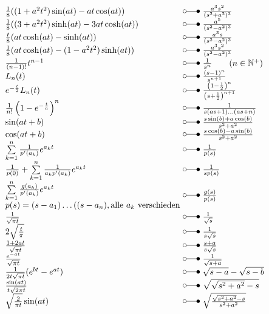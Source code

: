\[ \begin{array}{@{}l@{ ~ \laplace ~ }l@{}}
\frac{1}{8} ((1 + a^2 t^2) \sin(at) - at \cos(at)) &
    \frac{a^3 s^2}{(s^2 + a^2)^3} \\
\frac{1}{8} ((3 + a^2 t^2) \sinh(at) - 3 at \cosh(at)) &
    \frac{a^5}{(s^2 - a^2)^3} \\
\frac{t}{8} (at \cosh(at) - \sinh(at)) &
    \frac{a^3 s}{(s^2 - a^2)^3} \\
\frac{1}{8} (at \cosh(at) - (1 - a^2 t^2) \sinh(at)) &
    \frac{a^3 s^2}{(s^2 - a^2)^3} \\
\frac{1}{(n - 1)!} t^{n - 1} &
    \frac{1}{s^n} \qquad (n \in \mathbb{N^+}) \\
L_n(t) &
    \frac{(s - 1)^n}{s^{n + 1}} \\
e^{-\frac{t}{2}} L_n(t) &
    \frac{\left(1 - \frac{1}{2}\right)^n}{\left(s + \frac{1}{2}\right)^{n + 1}} \\
\frac{1}{n!} \left(1 - e^{-\frac{t}{a}}\right)^n &
    \frac{1}{s (as + 1) \ldots (as + n)} \\
\sin(at + b) &
    \frac{s \sin(b) + a \cos(b)}{s^2 + a^2} \\
\cos(at + b) &
    \frac{s \cos(b) - a \sin(b)}{s^2 + a^2} \\
\sum\limits_{k=1}^{n} \frac{1}{p'(a_k)} e^{a_k t} &
    \frac{1}{p(s)} \\
\frac{1}{p(0)} + \sum\limits_{k=1}^{n} \frac{1}{a_k p'(a_k)} e^{a_k t} &
    \frac{1}{s p(s)} \\
\begin{array}{@{}l@{}}
\sum\limits_{k=1}^{n} \frac{g(a_k)}{p'(a_k)} e^{a_k t} \\
p(s) = (s - a_1) \ldots ((s - a_n), \text{alle } a_k \text{ verschieden} \\
\end{array} &
    \frac{g(s)}{p(s)} \\
\frac{1}{\sqrt{\pi t}} &
    \frac{1}{\sqrt{s}} \\
2 \sqrt{\frac{t}{\pi}} &
    \frac{1}{s \sqrt{s}} \\
\frac{1 + 2 at}{\sqrt{\pi t}} &
    \frac{s + a}{s \sqrt{s}} \\
\frac{e^{-at}}{\sqrt{\pi t}} &
    \frac{1}{\sqrt{s + a}} \\
\frac{1}{2 t \sqrt{\pi t}} (e^{bt} - e^{at}) &
    \sqrt{s - a} - \sqrt{s - b} \\
\frac{\sin(at)}{t \sqrt{2 \pi t}} &
    \sqrt{\sqrt{s^2 + a^2} - s} \\
\sqrt{\frac{2}{\pi t}} \sin(at) &
    \sqrt{\frac{\sqrt{s^2 + a^2} - s}{s^2 + a^2}} \\
\end{array} \]

